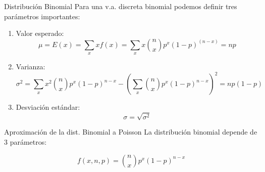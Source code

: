 \documentclass{beamer}
\begin{document}
\begin{frame}{Distribución Binomial}
  Para una v.a. discreta binomial podemos definir tres parámetros importantes:

  \begin{enumerate}
    \item Valor esperado:
    \begin{equation}
      \mu = E(x) = \sum_{x}^{} x f(x) = \sum_{x}^{} x \binom{n}{x} p^x (1-p)^(n-x) = np
    \end{equation}

    \item Varianza:
    \begin{equation}
      \sigma^2 = \sum_{x} x^2 \binom{n}{x} p^x (1-p)^{n-x} - (\sum_{x} \binom{n}{x} p^x (1-p)^{n-x})^2 = np(1-p)
    \end{equation}

    \item Desviación estándar:
    \begin{equation}
      \sigma = \sqrt{\sigma^2}
    \end{equation}

  \end{enumerate}

\end{frame}


\begin{frame}{Aproximación de la dist. Binomial a Poisson}
  La distribución binomial depende de 3 parámetros:

  \begin{equation}
    f(x,n,p) = \binom{n}{x} p^x (1-p)^{n-x}
  \end{equation}

\end{frame}


\begin{frame}{}
\end{frame}
\end{document}
